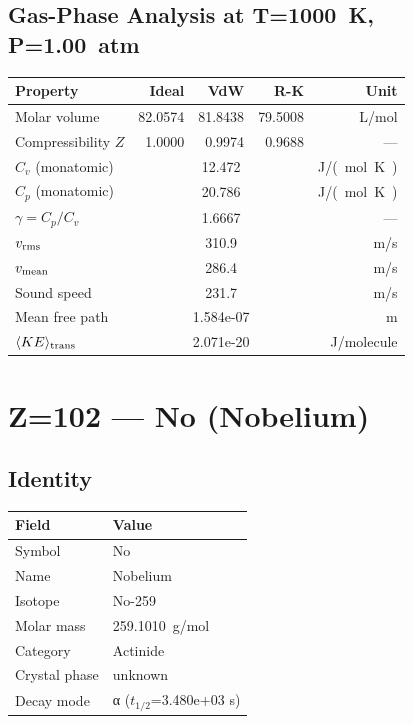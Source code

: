 \documentclass[11pt,a4paper]{article}
\begin{document}
\subsection{Gas-Phase Analysis at T=\SI{1000}{K}, P=\SI{1.00}{atm}}
\begin{tabular}{lrrrr}
  \toprule
  Property & Ideal & VdW & R-K & Unit \\
  \midrule
  Molar volume & 82.0574 & 81.8438 & 79.5008 & \si{L/mol} \\
  Compressibility $Z$ & 1.0000 & 0.9974 & 0.9688 & --- \\
  \midrule
  $C_v$ (monatomic) & \multicolumn{3}{c}{12.472} & \si{J/(mol.K)} \\
  $C_p$ (monatomic) & \multicolumn{3}{c}{20.786} & \si{J/(mol.K)} \\
  $\gamma = C_p/C_v$ & \multicolumn{3}{c}{1.6667} & --- \\
  $v_{\rm rms}$ & \multicolumn{3}{c}{310.9} & \si{m/s} \\
  $v_{\rm mean}$ & \multicolumn{3}{c}{286.4} & \si{m/s} \\
  Sound speed & \multicolumn{3}{c}{231.7} & \si{m/s} \\
  Mean free path & \multicolumn{3}{c}{1.584e-07} & \si{m} \\
  $\langle KE \rangle_{\rm trans}$ & \multicolumn{3}{c}{2.071e-20} & \si{J/molecule} \\
  \bottomrule
\end{tabular}

\newpage

\section{Z=102 --- No (Nobelium)}
\label{sec:Z102}

\subsection{Identity}
\begin{tabular}{ll}
  \toprule
  Field & Value \\
  \midrule
  Symbol & No \\
  Name & Nobelium \\
  Isotope & No-259 \\
  Molar mass & \SI{259.1010}{g/mol} \\
  Category & Actinide \\
  Crystal phase & unknown \\
  Decay mode & α ($t_{1/2}$=3.480e+03 s) \\
  \bottomrule
\end{tabular}
\end{document}
